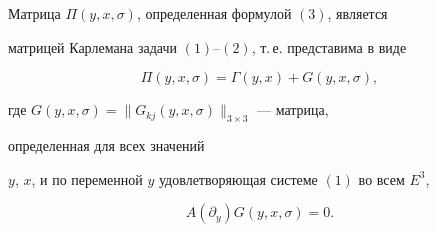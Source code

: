  


 


\begin{lem} 


Матрица $\Pi(y,x,\sigma)$, определенная формулой $(3)$, является 


матрицей Карлемана задачи $(1)$--$(2)$, т.\,е. представима в виде 


\begin{equation} 


\Pi(y,x,\sigma)=\Gamma(y,x)+G(y,x,\sigma), 


\end{equation} 


где $G(y,x,\sigma)=\|G_{kj}(y,x,\sigma)\|_{3\times 3}$ --- матрица, 


определенная для всех значений 


$y$, $x$, и по переменной $y$ удовлетворяющая системе $(1)$ во всем $E^3$,


\begin{equation} 


A(\partial_y)G(y,x,\sigma)=0. 


\end{equation} 


\end{lem} 


 


 


